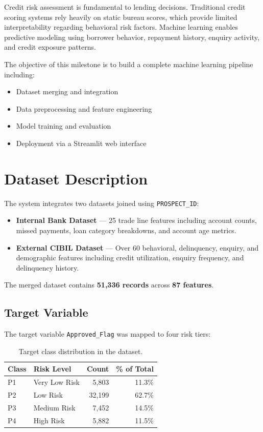 \documentclass[12pt,a4paper]{article}
\begin{document}
Credit risk assessment is fundamental to lending decisions. Traditional credit scoring systems rely heavily on static bureau scores, which provide limited interpretability regarding behavioral risk factors. Machine learning enables predictive modeling using borrower behavior, repayment history, enquiry activity, and credit exposure patterns.

The objective of this milestone is to build a complete machine learning pipeline including:
\begin{itemize}[nosep]
    \item Dataset merging and integration
    \item Data preprocessing and feature engineering
    \item Model training and evaluation
    \item Deployment via a Streamlit web interface
\end{itemize}

\section{Dataset Description}

The system integrates two datasets joined using \texttt{PROSPECT\_ID}:

\begin{itemize}[nosep]
    \item \textbf{Internal Bank Dataset} --- 25 trade line features including account counts, missed payments, loan category breakdowns, and account age metrics.
    \item \textbf{External CIBIL Dataset} --- Over 60 behavioral, delinquency, enquiry, and demographic features including credit utilization, enquiry frequency, and delinquency history.
\end{itemize}

\noindent The merged dataset contains \textbf{51,336 records} across \textbf{87 features}.

\subsection{Target Variable}

The target variable \texttt{Approved\_Flag} was mapped to four risk tiers:

\begin{table}[h!]
    \centering
    \begin{tabular}{@{} l l r r @{}}
        \toprule
        \textbf{Class} & \textbf{Risk Level} & \textbf{Count} & \textbf{\% of Total} \\
        \midrule
        P1 & Very Low Risk  & 5,803  & 11.3\% \\
        P2 & Low Risk       & 32,199 & 62.7\% \\
        P3 & Medium Risk    & 7,452  & 14.5\% \\
        P4 & High Risk      & 5,882  & 11.5\% \\
        \bottomrule
    \end{tabular}
    \caption{Target class distribution in the dataset.}
    \label{tab:class_dist}
\end{table}
\end{document}
